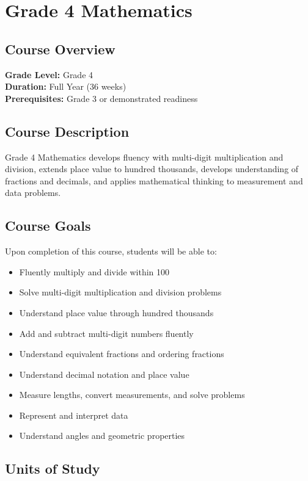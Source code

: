 \documentclass[11pt,letterpaper]{report}
\begin{document}
\chapter{Grade 4 Mathematics}

\section{Course Overview}

\textbf{Grade Level:} Grade 4\\
\textbf{Duration:} Full Year (36 weeks)\\
\textbf{Prerequisites:} Grade 3 or demonstrated readiness

\section{Course Description}

Grade 4 Mathematics develops fluency with multi-digit multiplication and division, extends place value to hundred thousands, develops understanding of fractions and decimals, and applies mathematical thinking to measurement and data problems.

\section{Course Goals}

Upon completion of this course, students will be able to:

\begin{itemize}
    \item Fluently multiply and divide within 100
    \item Solve multi-digit multiplication and division problems
    \item Understand place value through hundred thousands
    \item Add and subtract multi-digit numbers fluently
    \item Understand equivalent fractions and ordering fractions
    \item Understand decimal notation and place value
    \item Measure lengths, convert measurements, and solve problems
    \item Represent and interpret data
    \item Understand angles and geometric properties
\end{itemize}

\section{Units of Study}
\end{document}
